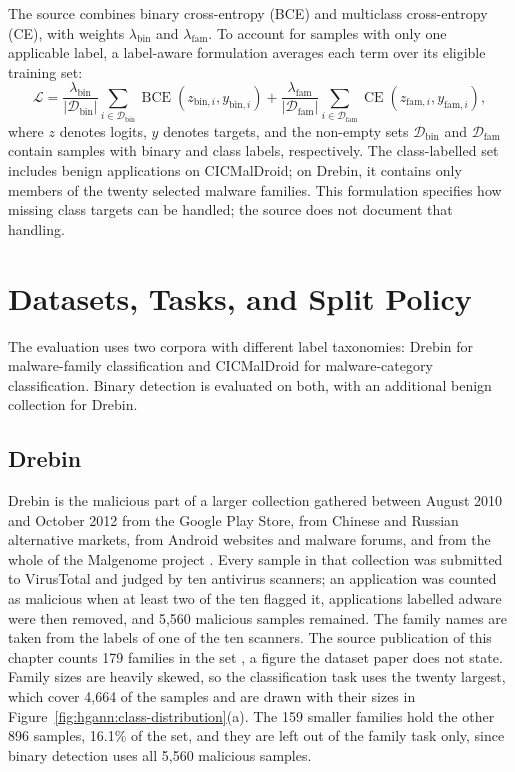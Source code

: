 The source combines binary cross-entropy (BCE) and multiclass cross-entropy (CE), with weights
$\lambda_{\text{bin}}$ and $\lambda_{\text{fam}}$. To account for samples with only one applicable
label, a label-aware formulation averages each term over its eligible training set:
\begin{equation}
  \mathcal{L} = \frac{\lambda_{\text{bin}}}{\lvert \mathcal{D}_{\text{bin}} \rvert}
  \sum_{i \in \mathcal{D}_{\text{bin}}} \operatorname{BCE}(z_{\text{bin},i}, y_{\text{bin},i})
  + \frac{\lambda_{\text{fam}}}{\lvert \mathcal{D}_{\text{fam}} \rvert}
  \sum_{i \in \mathcal{D}_{\text{fam}}} \operatorname{CE}(z_{\text{fam},i}, y_{\text{fam},i}) ,
  \label{eq:hgann:maskedloss}
\end{equation}
where $z$ denotes logits, $y$ denotes targets, and the non-empty sets
$\mathcal{D}_{\text{bin}}$ and $\mathcal{D}_{\text{fam}}$ contain samples with binary and class
labels, respectively. The class-labelled set includes benign applications on CICMalDroid;
on Drebin, it contains only members of the twenty selected malware families. This formulation
specifies how missing class targets can be handled; the source does not document that handling.

\section{Datasets, Tasks, and Split Policy}
\label{sec:hgann:9}

The evaluation uses two corpora with different label taxonomies: Drebin for malware-family
classification and CICMalDroid for malware-category classification. Binary detection is
evaluated on both, with an additional benign collection for Drebin.

\subsection*{Drebin}

Drebin is the malicious part of a larger collection gathered between August 2010 and October 2012
from the Google Play Store, from Chinese and Russian alternative markets, from Android websites and
malware forums, and from the whole of the Malgenome project \cite{arp2014drebin}. Every sample in
that collection was submitted to VirusTotal and judged by ten antivirus scanners; an application
was counted as malicious when at least two of the ten flagged it, applications labelled adware were
then removed, and 5,560 malicious samples remained. The family names are taken from the labels of
one of the ten scanners. The source publication of this chapter counts 179 families in the set
\cite{norouzian2025hgannmal}, a figure the dataset paper does not state. Family sizes are heavily
skewed, so the classification task uses the twenty largest, which cover 4,664 of the samples and
are drawn with their sizes in Figure~\ref{fig:hgann:class-distribution}(a). The 159 smaller
families hold the other 896 samples, 16.1\% of the set, and they are left out of the
family task only, since binary detection uses all 5,560 malicious samples.

